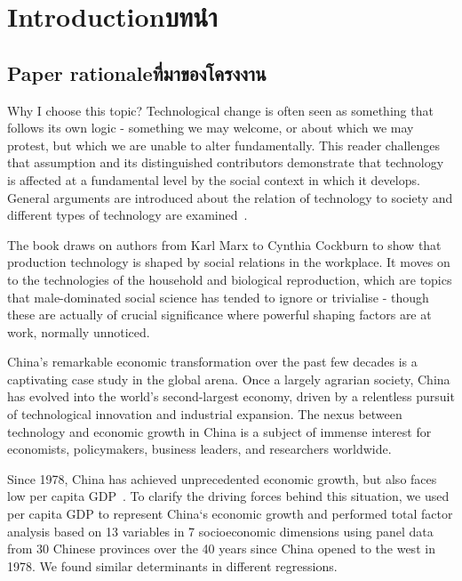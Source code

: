 \chapter{\ifenglish Introduction\else บทนำ\fi}

\section{\ifenglish Paper rationale\else ที่มาของโครงงาน\fi}

Why I choose this topic? Technological change is often seen as something that 
follows its own logic - something we may welcome, or about which we may protest, 
but which we are unable to alter fundamentally. This reader challenges that 
assumption and its distinguished contributors demonstrate that technology is 
affected at a fundamental level by the social context in which it develops. 
General arguments are introduced about the relation of technology to society 
and different types of technology are examined~\cite{mackenzie2011social}.

The book draws on authors from Karl Marx to Cynthia Cockburn to show that 
production technology is shaped by social relations in the workplace. It moves 
on to the technologies of the household and biological reproduction, which are 
topics that male-dominated social science has tended to ignore or trivialise - 
though these are actually of crucial significance where powerful shaping factors 
are at work, normally unnoticed.

China's remarkable economic transformation over the past few decades is a 
captivating case study in the global arena. Once a largely agrarian society, 
China has evolved into the world's second-largest economy, driven by a 
relentless pursuit of technological innovation and industrial expansion. 
The nexus between technology and economic growth in China is a subject of 
immense interest for economists, policymakers, business leaders, and 
researchers worldwide.

Since 1978, China has achieved unprecedented economic growth, but also faces low 
per capita GDP~\cite{GUO2022100982}. To clarify the driving forces behind this situation, we used per 
capita GDP to represent China`s economic growth and performed total factor 
analysis based on 13 variables in 7 socioeconomic dimensions using panel data 
from 30 Chinese provinces over the 40 years since China opened to the west in 
1978. We found similar determinants in different regressions.

